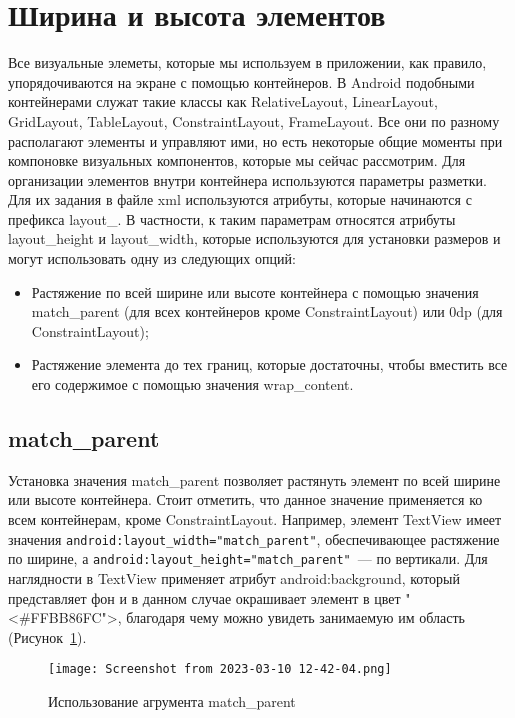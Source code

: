 \section{Ширина и высота элементов}
Все визуальные элеметы, которые мы используем в приложении, как
правило, упорядочиваются на экране с помощью контейнеров. В Android
подобными контейнерами служат такие классы как RelativeLayout,
LinearLayout, GridLayout, TableLayout, ConstraintLayout, FrameLayout. Все
они по разному располагают элементы и управляют ими, но есть некоторые
общие моменты при компоновке визуальных компонентов, которые мы
сейчас рассмотрим.
Для организации элементов внутри контейнера используются параметры
разметки. Для их задания в файле xml используются атрибуты, которые
начинаются с префикса layout\_. В частности, к таким параметрам относятся
атрибуты layout\_height и layout\_width, которые используются для установки
размеров и могут использовать одну из следующих опций:
\begin{itemize}
	\item Растяжение по всей ширине или высоте контейнера с помощью значения
		match\_parent (для всех контейнеров кроме ConstraintLayout)
		или 0dp (для ConstraintLayout);
	\item Растяжение элемента до тех границ, которые достаточны,
		чтобы вместить все его содержимое с помощью значения wrap\_content.
\end{itemize}

\subsection{match\_parent}
Установка значения match\_parent позволяет растянуть элемент по всей
ширине или высоте контейнера. Стоит отметить, что данное значение
применяется ко всем контейнерам, кроме ConstraintLayout. Например,
элемент TextView имеет значения
\texttt{android:layout\_width="match\_parent"}, обеспечивающее растяжение
по ширине, а \texttt{android:layout\_height="match\_parent"}~--- по вертикали.
Для наглядности в TextView применяет атрибут android:background,
который представляет фон и в данном случае окрашивает элемент
в цвет "<\#FFBB86FC">, благодаря чему можно увидеть занимаемую им область
(Рисунок~\ref{fig:xm:set:hw}).

\begin{figure}[h!tp]
	\centering
	\texttt{[image: Screenshot from 2023-03-10 12-42-04.png]}
	\caption{Использование агрумента match\_parent}
	\label{fig:xm:set:hw}
\end{figure}


